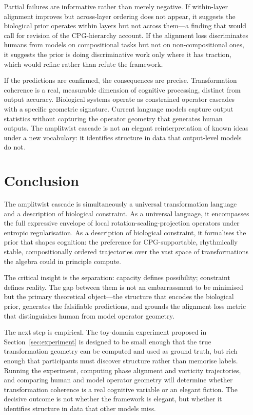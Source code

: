 \documentclass[12pt, a4paper]{article}
\theoremstyle{remark}
\theoremstyle{definition}
\begin{document}
Partial failures are informative rather than merely negative.  If within-layer alignment
improves but across-layer ordering does not appear, it suggests the biological prior
operates within layers but not across them---a finding that would call for revision of the
CPG-hierarchy account.  If the alignment loss discriminates humans from models on
compositional tasks but not on non-compositional ones, it suggests the prior is doing
discriminative work only where it has traction, which would refine rather than refute the
framework.

If the predictions are confirmed, the consequences are precise.  Transformation coherence
is a real, measurable dimension of cognitive processing, distinct from output accuracy.
Biological systems operate as constrained operator cascades with a specific geometric
signature.  Current language models capture output statistics without capturing the
operator geometry that generates human outputs.  The amplitwist cascade is not an elegant
reinterpretation of known ideas under a new vocabulary: it identifies structure in data
that output-level models do not.

\section{Conclusion}
\label{sec:conclusion}

The amplitwist cascade is simultaneously a universal transformation language and a
description of biological constraint.  As a universal language, it encompasses the full
expressive envelope of local rotation-scaling-projection operators under entropic
regularisation.  As a description of biological constraint, it formalises the prior that
shapes cognition: the preference for CPG-supportable, rhythmically stable, compositionally
ordered trajectories over the vast space of transformations the algebra could in principle
compute.

The critical insight is the separation: capacity defines possibility; constraint defines
reality.  The gap between them is not an embarrassment to be minimised but the primary
theoretical object---the structure that encodes the biological prior, generates the
falsifiable predictions, and grounds the alignment loss metric that distinguishes human from
model operator geometry.

The next step is empirical.  The toy-domain experiment proposed in
Section~\ref{sec:experiment} is designed to be small enough that the true transformation
geometry can be computed and used as ground truth, but rich enough that participants must
discover structure rather than memorise labels.  Running the experiment, computing phase
alignment and vorticity trajectories, and comparing human and model operator geometry will
determine whether transformation coherence is a real cognitive variable or an elegant
fiction.  The decisive outcome is not whether the framework is elegant, but whether it
identifies structure in data that other models miss.
\end{document}
